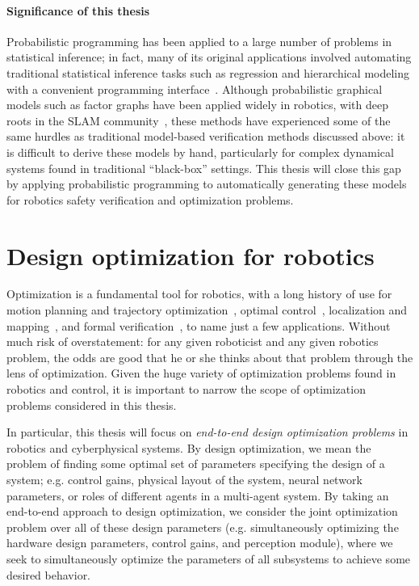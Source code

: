 \paragraph{Significance of this thesis} Probabilistic programming has been applied to a large number of problems in statistical inference; in fact, many of its original applications involved automating traditional statistical inference tasks such as regression and hierarchical modeling with a convenient programming interface~\cite{cusumano-townerGenGeneralpurposeProbabilistic2019}. Although probabilistic graphical models such as factor graphs have been applied widely in robotics, with deep roots in the SLAM community~\cite{dellaertFactorGraphsExploiting2021}, these methods have experienced some of the same hurdles as traditional model-based verification methods discussed above: it is difficult to derive these models by hand, particularly for complex dynamical systems found in traditional ``black-box'' settings. This thesis will close this gap by applying probabilistic programming to automatically generating these models for robotics safety verification and optimization problems.

\section{Design optimization for robotics}

Optimization is a fundamental tool for robotics, with a long history of use for motion planning and trajectory optimization~\cite{schulmanMotionPlanningSequential2014}, optimal control~\cite{liberzonCalculusVariationsOptimal2012}, localization and mapping~\cite{dellaertFactorGraphsExploiting2021}, and formal verification~\cite{liuAlgorithmsVerifyingDeep2021}, to name just a few applications. Without much risk of overstatement: for any given roboticist and any given robotics problem, the odds are good that he or she thinks about that problem through the lens of optimization. Given the huge variety of optimization problems found in robotics and control, it is important to narrow the scope of optimization problems considered in this thesis.

In particular, this thesis will focus on \textit{end-to-end design optimization problems} in robotics and cyberphysical systems. By design optimization, we mean the problem of finding some optimal set of parameters specifying the design of a system; e.g. control gains, physical layout of the system, neural network parameters, or roles of different agents in a multi-agent system. By taking an end-to-end approach to design optimization, we consider the joint optimization problem over all of these design parameters (e.g. simultaneously optimizing the hardware design parameters, control gains, and perception module), where we seek to simultaneously optimize the parameters of all subsystems to achieve some desired behavior.

